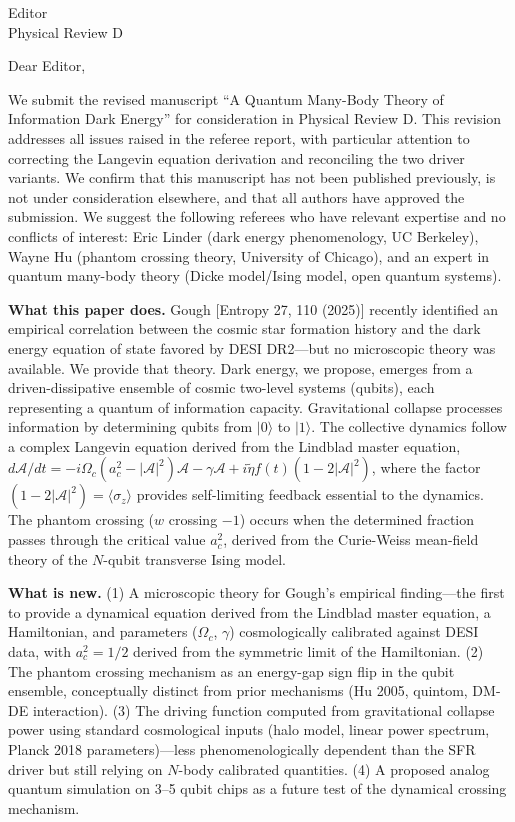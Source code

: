 \documentclass[12pt]{letter}
\begin{document}
\begin{letter}{Editor\\Physical Review D}

\opening{Dear Editor,}

We submit the revised manuscript ``A Quantum Many-Body Theory of Information Dark Energy'' for consideration in Physical Review D. This revision addresses all issues raised in the referee report, with particular attention to correcting the Langevin equation derivation and reconciling the two driver variants. We confirm that this manuscript has not been published previously, is not under consideration elsewhere, and that all authors have approved the submission. We suggest the following referees who have relevant expertise and no conflicts of interest: Eric Linder (dark energy phenomenology, UC Berkeley), Wayne Hu (phantom crossing theory, University of Chicago), and an expert in quantum many-body theory (Dicke model/Ising model, open quantum systems).

\textbf{What this paper does.} Gough [Entropy 27, 110 (2025)] recently identified an empirical correlation between the cosmic star formation history and the dark energy equation of state favored by DESI DR2---but no microscopic theory was available. We provide that theory. Dark energy, we propose, emerges from a driven-dissipative ensemble of cosmic two-level systems (qubits), each representing a quantum of information capacity. Gravitational collapse processes information by determining qubits from $|0\rangle$ to $|1\rangle$. The collective dynamics follow a complex Langevin equation derived from the Lindblad master equation, $d\mathcal{A}/dt = -i\Omega_c(a_c^2 - |\mathcal{A}|^2)\mathcal{A} - \gamma\mathcal{A} + i\tilde{\eta}f(t)(1-2|\mathcal{A}|^2)$, where the factor $(1-2|\mathcal{A}|^2) = \langle\sigma_z\rangle$ provides self-limiting feedback essential to the dynamics. The phantom crossing ($w$ crossing $-1$) occurs when the determined fraction passes through the critical value $a_c^2$, derived from the Curie-Weiss mean-field theory of the $N$-qubit transverse Ising model.

\textbf{What is new.} (1) A microscopic theory for Gough's empirical finding---the first to provide a dynamical equation derived from the Lindblad master equation, a Hamiltonian, and parameters ($\Omega_c$, $\gamma$) cosmologically calibrated against DESI data, with $a_c^2 = 1/2$ derived from the symmetric limit of the Hamiltonian. (2) The phantom crossing mechanism as an energy-gap sign flip in the qubit ensemble, conceptually distinct from prior mechanisms (Hu 2005, quintom, DM-DE interaction). (3) The driving function computed from gravitational collapse power using standard cosmological inputs (halo model, linear power spectrum, Planck 2018 parameters)---less phenomenologically dependent than the SFR driver but still relying on $N$-body calibrated quantities. (4) A proposed analog quantum simulation on 3--5 qubit chips as a future test of the dynamical crossing mechanism.


\end{letter}
\end{document}
